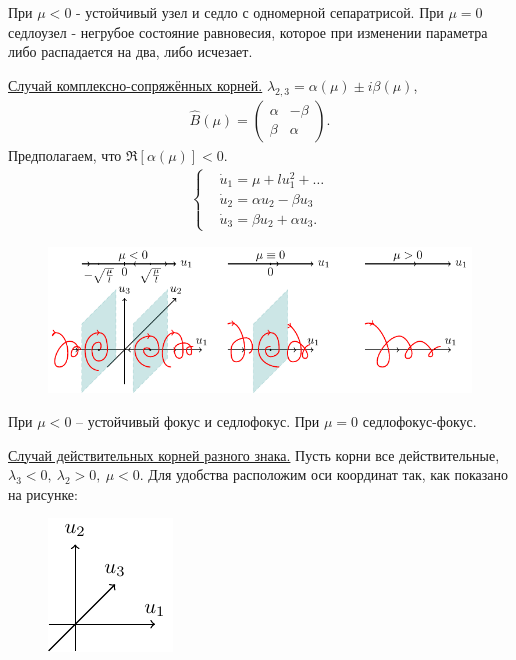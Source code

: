 При $\mu<0$ - устойчивый узел и седло с одномерной сепаратрисой. При $\mu=0$ седлоузел - негрубое состояние равновесия, которое при изменении параметра либо распадается на два, либо исчезает. 

\underline{Случай комплексно-сопряжённых корней.} $\lambda_{2,3}=\alpha(\mu)\pm i \beta(\mu)$,
\begin{gather*}
	\hat{B}(\mu)=
	\begin{pmatrix}
		\alpha &-\beta \\
		\beta &\alpha
	\end{pmatrix}
	.
\end{gather*}
Предполагаем, что $\Re[\alpha(\mu)]<0$.
\begin{gather*}
	\left\{\begin{aligned}
		&\dot u_1 = \mu+lu_1^2+\dots \\
		&\dot u_2 = \alpha u_2-\beta u_3 \\
		&\dot u_3 = \beta u_2+\alpha u_3.
	\end{aligned}\right.
\end{gather*}
\begin{figure}[H]
	\centering
	\includegraphics[width=\textwidth]{img/multidimensional_dynamic_systems/2kr_2}
\end{figure}

При $\mu<0$ -- устойчивый фокус и седлофокус. При $\mu=0$ седлофокус-фокус.

\underline{Случай действительных корней разного знака.} Пусть корни все действительные, $\lambda_3<0,~\lambda_2>0,~\mu<0$. Для удобства расположим оси координат так, как показано на рисунке:
\begin{figure}[H]
	\centering
	\includegraphics[scale=1.5]{img/multidimensional_dynamic_systems/coord}
\end{figure}

